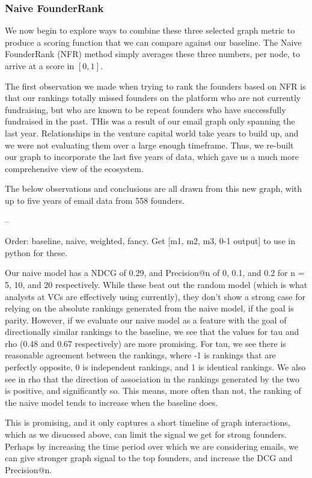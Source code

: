 \subsubsection{Naive FounderRank}

We now begin to explore ways to combine these three selected graph metric to produce a scoring function that we can compare against our baseline. The Naive FounderRank (NFR) method simply averages these three numbers, per node, to arrive at a score in $[0, 1]$.

The first observation we made when trying to rank the founders based on NFR is that our rankings totally missed founders on the platform who are not currently fundraising, but who are known to be repeat founders who have successfully fundraised in the past. THis was a result of our email graph only spanning the last year. Relationships in the venture capital world take years to build up, and we were not evaluating them over a large enough timeframe. Thus, we re-built our graph to incorporate the last five years of data, which gave us a much more comprehensive view of the ecosystem.

The below observations and conclusions are all drawn from this new graph, with up to five years of email data from 558 founders.



--



Order: baseline, naive, weighted, fancy.
Get [m1, m2, m3, 0-1 output] to use in python for these.

Our naive model has a NDCG of 0.29, and Precision@n of 0, 0.1, and 0.2 for n = 5, 10, and 20 respectively. While these beat out the random model (which is what analysts at VCs are effectively using currently), they don't show a strong case for relying on the absolute rankings generated from the naive model, if the goal is parity. However, if we evaluate our naive model as a feature with the goal of directionally similar rankings to the baseline, we see that the values for tau and rho (0.48 and 0.67 respectively) are more promising. For tau, we see there is reasonable agreement between the rankings, where -1 is rankings that are perfectly opposite, 0 is independent rankings, and 1 is identical rankings. We also see in rho that the direction of association in the rankings generated by the two is positive, and significantly so. This means, more often than not, the ranking of the naive model tends to increase when the baseline does.

This is promising, and it only captures a short timeline of graph interactions, which as we disucssed above, can limit the signal we get for strong founders. Perhaps by increasing the time period over which we are considering emails, we can give stronger graph signal to the top founders, and increase the DCG and Precision@n.

